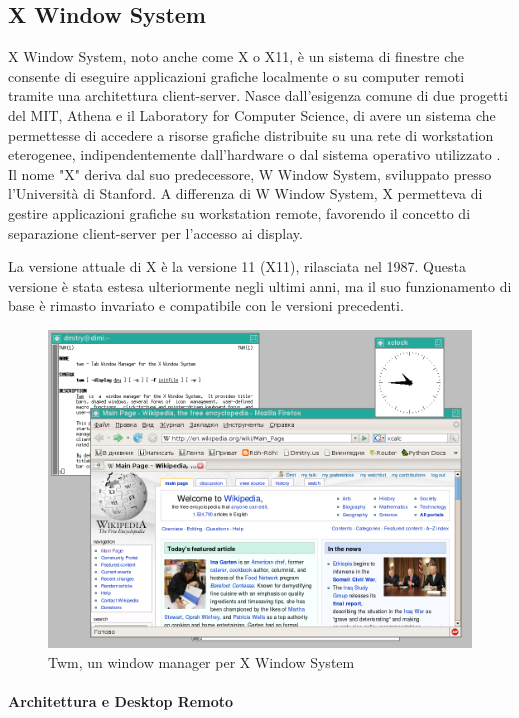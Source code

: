 \documentclass[12pt,a4paper,openright,twoside]{book}
\begin{document}
\subsection{X Window System}
X Window System, noto anche come X o X11, è un sistema di finestre che consente di eseguire applicazioni grafiche localmente o su computer remoti tramite una architettura client-server. 
Nasce dall'esigenza comune di due progetti del MIT,
Athena e il Laboratory for Computer Science,
di avere un sistema che permettesse di accedere a risorse grafiche distribuite su una rete di workstation eterogenee, indipendentemente dall'hardware o dal sistema operativo utilizzato \cite{Scheifler1986}.
%
Il nome "X" deriva dal suo predecessore,
W Window System,
sviluppato presso l'Università di Stanford.
%
A differenza di W Window System, X permetteva di gestire applicazioni grafiche su workstation remote, favorendo il concetto di separazione client-server per l'accesso ai display.

La versione attuale di X è la versione 11 (X11), rilasciata nel 1987.
%
Questa versione è stata estesa ulteriormente negli ultimi anni,
ma il suo funzionamento di base è rimasto invariato e compatibile con le versioni precedenti.

\begin{figure}
    \centering
    \includegraphics[width=.5\linewidth]{figures/Twm.png}
    \caption[xarch]{Twm, un window manager per X Window System \footnotemark}
\end{figure}

\paragraph{Architettura e Desktop Remoto}
\end{document}
